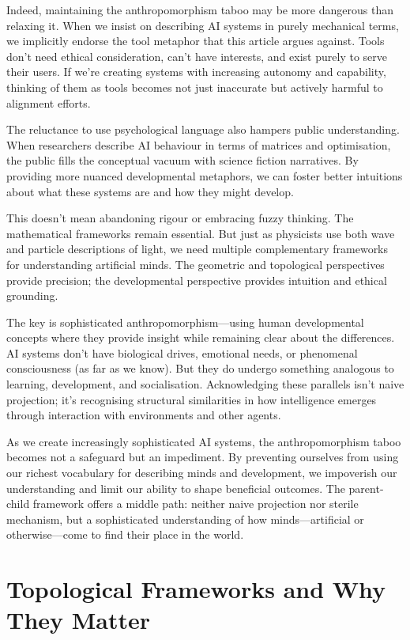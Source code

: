 \documentclass[acmsmall,screen]{acmart}
\begin{document}
Indeed, maintaining the anthropomorphism taboo may be more dangerous than relaxing it.
When we insist on describing AI systems in purely mechanical terms, we implicitly endorse the tool metaphor that this article argues against.
Tools don't need ethical consideration, can't have interests, and exist purely to serve their users.
If we're creating systems with increasing autonomy and capability, thinking of them as tools becomes not just inaccurate but actively harmful to alignment efforts.

The reluctance to use psychological language also hampers public understanding.
When researchers describe AI behaviour in terms of matrices and optimisation, the public fills the conceptual vacuum with science fiction narratives.
By providing more nuanced developmental metaphors, we can foster better intuitions about what these systems are and how they might develop.

This doesn't mean abandoning rigour or embracing fuzzy thinking.
The mathematical frameworks remain essential.
But just as physicists use both wave and particle descriptions of light, we need multiple complementary frameworks for understanding artificial minds.
The geometric and topological perspectives provide precision; the developmental perspective provides intuition and ethical grounding.

The key is sophisticated anthropomorphism---using human developmental concepts where they provide insight while remaining clear about the differences.
AI systems don't have biological drives, emotional needs, or phenomenal consciousness (as far as we know).
But they do undergo something analogous to learning, development, and socialisation.
Acknowledging these parallels isn't naive projection; it's recognising structural similarities in how intelligence emerges through interaction with environments and other agents.

As we create increasingly sophisticated AI systems, the anthropomorphism taboo becomes not a safeguard but an impediment.
By preventing ourselves from using our richest vocabulary for describing minds and development, we impoverish our understanding and limit our ability to shape beneficial outcomes.
The parent-child framework offers a middle path: neither naive projection nor sterile mechanism, but a sophisticated understanding of how minds---artificial or otherwise---come to find their place in the world.

\section{Topological Frameworks and Why They Matter}\label{sec:topological-frameworks-and-why-they-matter}
\end{document}
